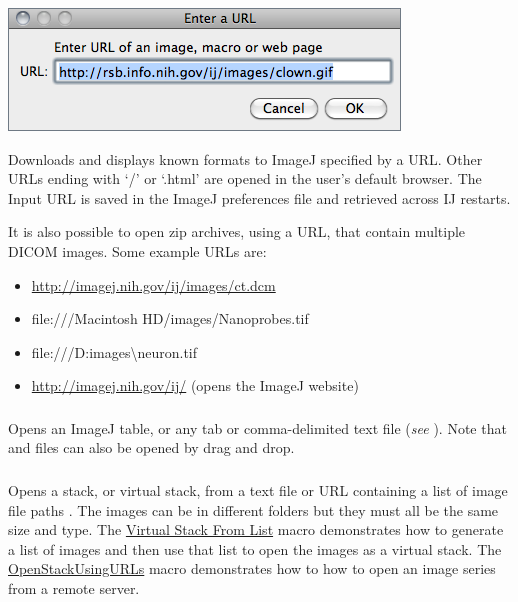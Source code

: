 \begin{minipage}[c][1\totalheight][t]{0.535\columnwidth}%
\includegraphics[scale=0.55]{images/Url}%
\end{minipage}%
\begin{minipage}[c][1\totalheight][t]{0.465\columnwidth}%
Downloads and displays known formats to ImageJ specified by a URL.
Other URLs ending with `/' or `.html' are opened in the user's
default browser. The Input URL is saved in the ImageJ preferences
file and retrieved across IJ restarts.%
\end{minipage}

It is also possible to open zip archives, using a URL, that contain
multiple DICOM images. Some example URLs are: 
\begin{itemize}
\item \url{http://imagej.nih.gov/ij/images/ct.dcm}
\item file:///Macintosh HD/images/Nanoprobes.tif
\item file:///D:images\textbackslash{}neuron.tif 
\item \url{http://imagej.nih.gov/ij/} (opens the ImageJ website)
\end{itemize}

\subsubsection[\protect\userinterface{Results\ldots{}}]{\protect{}\label{sub:Import>Results}}

Opens an ImageJ table, or any tab or comma-delimited text
file (\emph{see} ). Note that 
and  files can also be opened by drag and drop.


\subsubsection[\protect\userinterface{Stack From List\ldots{}}]{\protect{}\label{sub:Stack-From-List...}}

Opens a stack, or virtual stack, from a text file or URL containing
a list of image file paths \cite{C-StackFromList}. The images can
be in different folders but they must all be the same size and type.
The \href{http://imagej.nih.gov/ij/macros/VirtualStackFromList.txt}{Virtual Stack From List}
macro demonstrates how to generate a list of images and then use that
list to open the images as a virtual stack. The \href{http://imagej.nih.gov/ij/macros/OpenStackUsingURLs.txt}{OpenStackUsingURLs}
macro demonstrates how to how to open an image series from a remote
server.


